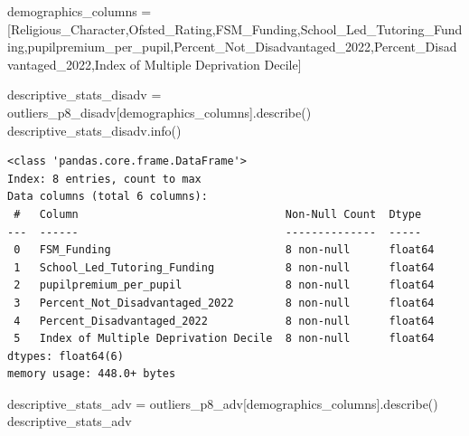 \documentclass[
  letterpaper,
  DIV=11,
  numbers=noendperiod]{scrartcl}
\newenvironment{Shaded}{\begin{snugshade}}{\end{snugshade}}
\newcommand{\NormalTok}[1]{\textcolor[rgb]{0.00,0.23,0.31}{#1}}
\newcommand{\OperatorTok}[1]{\textcolor[rgb]{0.37,0.37,0.37}{#1}}
\newcommand{\StringTok}[1]{\textcolor[rgb]{0.13,0.47,0.30}{#1}}
\begin{document}
\begin{Shaded}
\begin{Highlighting}[]
\NormalTok{demographics\_columns }\OperatorTok{=}\NormalTok{ [}\StringTok{\textquotesingle{}Religious\_Character\textquotesingle{}}\NormalTok{,}\StringTok{\textquotesingle{}Ofsted\_Rating\textquotesingle{}}\NormalTok{,}\StringTok{\textquotesingle{}FSM\_Funding\textquotesingle{}}\NormalTok{,}\StringTok{\textquotesingle{}School\_Led\_Tutoring\_Funding\textquotesingle{}}\NormalTok{,}\StringTok{\textquotesingle{}pupilpremium\_per\_pupil\textquotesingle{}}\NormalTok{,}\StringTok{\textquotesingle{}Percent\_Not\_Disadvantaged\_2022\textquotesingle{}}\NormalTok{,}\StringTok{\textquotesingle{}Percent\_Disadvantaged\_2022\textquotesingle{}}\NormalTok{,}\StringTok{\textquotesingle{}Index of Multiple Deprivation Decile\textquotesingle{}}\NormalTok{]}

\NormalTok{descriptive\_stats\_disadv }\OperatorTok{=}\NormalTok{ outliers\_p8\_disadv[demographics\_columns].describe()}
\NormalTok{descriptive\_stats\_disadv.info()}

\end{Highlighting}
\end{Shaded}

\begin{verbatim}
<class 'pandas.core.frame.DataFrame'>
Index: 8 entries, count to max
Data columns (total 6 columns):
 #   Column                                Non-Null Count  Dtype  
---  ------                                --------------  -----  
 0   FSM_Funding                           8 non-null      float64
 1   School_Led_Tutoring_Funding           8 non-null      float64
 2   pupilpremium_per_pupil                8 non-null      float64
 3   Percent_Not_Disadvantaged_2022        8 non-null      float64
 4   Percent_Disadvantaged_2022            8 non-null      float64
 5   Index of Multiple Deprivation Decile  8 non-null      float64
dtypes: float64(6)
memory usage: 448.0+ bytes
\end{verbatim}

\begin{Shaded}
\begin{Highlighting}[]
\NormalTok{descriptive\_stats\_adv }\OperatorTok{=}\NormalTok{ outliers\_p8\_adv[demographics\_columns].describe()}
\NormalTok{descriptive\_stats\_adv}
\end{Highlighting}
\end{Shaded}
\end{document}

